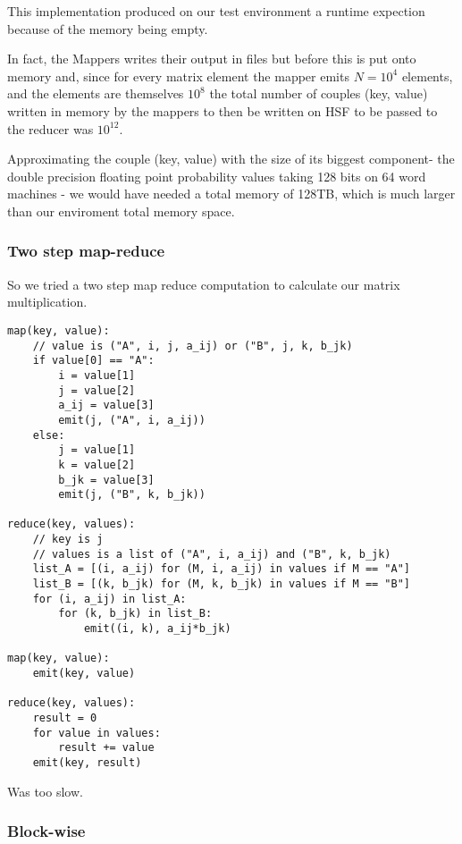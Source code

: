 This implementation produced on our test environment a runtime expection
because of the memory being empty.

In fact, the Mappers writes their output in files but before this is put onto memory
and, since for every matrix element the mapper emits $N=10^4$ elements, and the elements
are themselves $10^8$ the total number of couples (key, value) written in memory
by the mappers to then be written on HSF to be passed to the reducer was $10^12$.

Approximating the couple (key, value) with the size of its biggest component-
the double precision floating point probability values taking 128 bits on 64 word
machines - we would have needed a total memory of 128TB, which is much larger than
our enviroment total memory space.


\subsubsection{Two step map-reduce}

So we tried a two step map reduce computation to calculate our matrix multiplication.

\begin{verbatim}
map(key, value):
    // value is ("A", i, j, a_ij) or ("B", j, k, b_jk)
    if value[0] == "A":
        i = value[1]
        j = value[2]
        a_ij = value[3]
        emit(j, ("A", i, a_ij))
    else:
        j = value[1]
        k = value[2]
        b_jk = value[3]
        emit(j, ("B", k, b_jk))
 
reduce(key, values):
    // key is j
    // values is a list of ("A", i, a_ij) and ("B", k, b_jk)
    list_A = [(i, a_ij) for (M, i, a_ij) in values if M == "A"]
    list_B = [(k, b_jk) for (M, k, b_jk) in values if M == "B"]
    for (i, a_ij) in list_A:
        for (k, b_jk) in list_B:
            emit((i, k), a_ij*b_jk)

map(key, value):
    emit(key, value)
  
reduce(key, values):
    result = 0
    for value in values:
        result += value
    emit(key, result)

\end{verbatim}

Was too slow.

\subsubsection{Block-wise}

